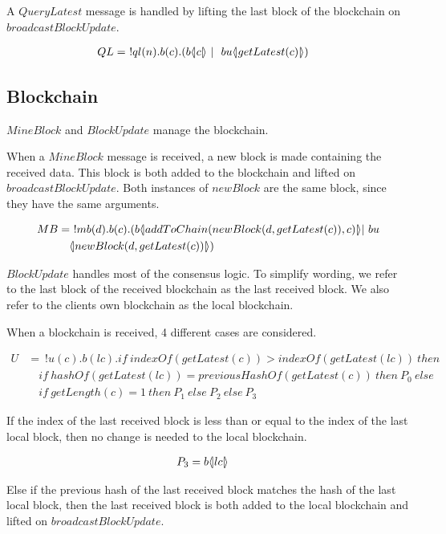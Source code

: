 A $QueryLatest$ message is handled by lifting the last block of the blockchain on $broadcastBlockUpdate$.

\begin{align*}
	QL &=\ !ql(n).b(c).(b  \langle \! | c | \! \rangle\ |\ \ bu \langle \! | getLatest(c) | \! \rangle)
\end{align*}

\subsection{Blockchain}

$MineBlock$ and $BlockUpdate$ manage the blockchain.

When a $MineBlock$ message is received, a new block is made containing the received data.
This block is both added to the blockchain and lifted on $broadcastBlockUpdate$.
Both instances of $newBlock$ are the same block, since they have the same arguments.

\begin{align*}
    MB &=\ !mb(d).b(c).(b  \langle \! | addToChain(newBlock(d,getLatest(c)),c) | \! \rangle| \ bu\\
    &\quad  \langle \! | newBlock(d, getLatest(c)) | \! \rangle)
\end{align*}

$BlockUpdate$ handles most of the consensus logic.
To simplify wording, we refer to the last block of the received blockchain as the last received block.
We also refer to the clients own blockchain as the local blockchain.

When a blockchain is received, 4 different cases are considered.

\begin{align*}
	U &=\ !u(c).b(lc).if\ indexOf( getLatest(c))>indexOf(getLatest(lc))\ then\\
	&\quad if\ hashOf(getLatest(lc))=previousHashOf(getLatest(c))\ then\ P_0\ else\\ &\quad if\ getLength(c)=1\ then\ P_1\ else\ P_2\ else\ P_3
\end{align*}

If the index of the last received block is less than or equal to the index of the last local block, then no change is needed to the local blockchain.

\begin{align*}
	P_3 &= b \langle \! | lc | \! \rangle
\end{align*}

Else if the previous hash of the last received block matches the hash of the last local block, then the last received block is both added to the local blockchain and lifted on $broadcastBlockUpdate$.

